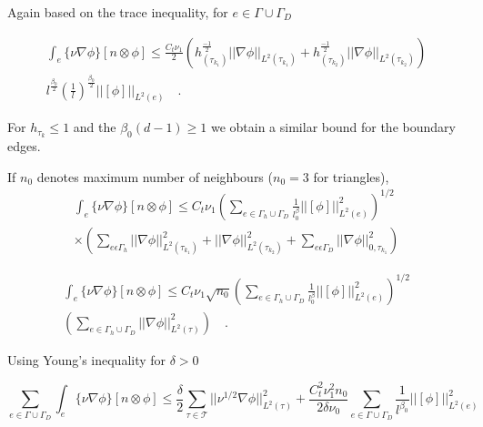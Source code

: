 \documentclass[a4paper]{book}
\begin{document}
Again based on the trace inequality, for $e \in \Gamma \cup \Gamma_D$

\begin{equation}
\begin{split}
\int_e \lbrace \nu \nabla \phi \rbrace [n \otimes \phi] \leq \frac{C_t \nu_1}{2}  \left( h_{(\tau_{k_1})}^{\frac{-1}{2}} ||\nabla \phi||_{L^2{(\tau_{k_1})}} + {h_{(\tau_{k_2})}^{\frac{-1}{2}}} ||\nabla \phi||_{L^2{(\tau_{k_2})}} \right) \\ l^{\frac{\beta_0}{2}} \left({\frac{1}{l}}\right)^{\frac{\beta_0}{2}} ||[\phi]||_{L^2(e)} \quad \textrm{.}
\end{split}
\end{equation}

For $h_{\tau_k} \leq 1$ and the $\beta_0 (d-1) \geq 1$ we obtain a similar bound for the boundary edges.

If $n_0$ denotes maximum number of neighbours ($n_0 = 3$ for triangles),
\begin{equation}
\begin{split}
\int_e \lbrace \nu \nabla \phi \rbrace[n \otimes \phi] \leq C_t \nu_1 \left( \sum_{e \in \Gamma_h \cup \Gamma_D} \frac{1}{l^\beta_0} ||[\phi]||^2_{L^2(e)} \right)^{1/2} \\ \times \left( \sum_{e \epsilon \Gamma_h} ||\nabla \phi||^2_{L^2(\tau_{k_1})} + ||\nabla \phi||^2_{L^2(\tau_{k_2})} + \sum_{e \epsilon \Gamma_D} ||\nabla \phi||^2_{0,\tau_{k_1}} \right)
\end{split}
\end{equation}

\begin{equation}
\begin{split}
\int_e \lbrace \nu \nabla \phi \rbrace[n \otimes \phi] \leq C_t \nu_1 \sqrt{n_0} \left( \sum_{e \in \Gamma_h \cup \Gamma_D} \frac{1}{l^\beta_0} ||[\phi]||^2_{L^2(e)} \right)^{1/2} \\ \left( \sum_{e \in \Gamma_h \cup \Gamma_D} ||\nabla \phi||^2_{L^2(\tau)} \right) \quad \textrm{.}
\end{split}
\end{equation}

Using Young's inequality for $\delta > 0$

\begin{equation}
\sum_{e \in \Gamma \cup \Gamma_D} \int_e \lbrace \nu \nabla \phi \rbrace [n \otimes \phi] \leq \frac{\delta}{2} \sum_{\tau \in \mathcal{T}} ||\nu^{1/2} \nabla \phi ||^2_{L^2(\tau)} +  \frac{C_t^2 \nu_1^2 n_0}{2 \delta \nu_0}  \sum_{e \in \Gamma \cup \Gamma_D} \frac{1}{l^{\beta_0}} ||[\phi]||^2_{L^2(e)}
\end{equation}
\end{document}

